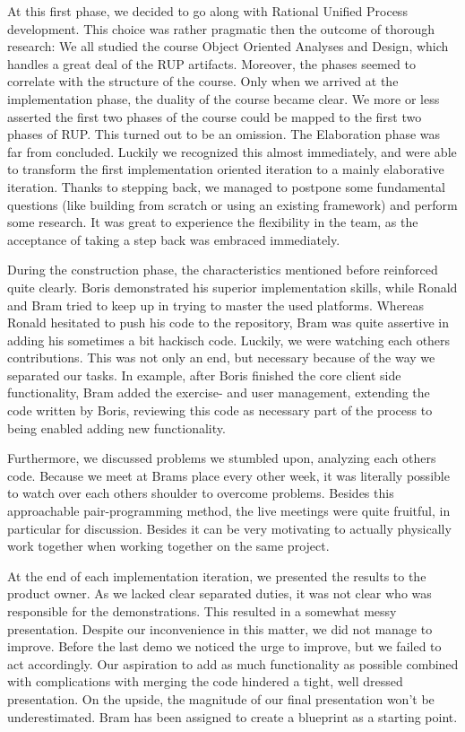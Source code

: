 At this first phase, we decided to go along with Rational Unified Process
development. This choice was rather pragmatic then the outcome of thorough
research: We all studied the course Object Oriented Analyses and Design, which
handles a great deal of the RUP artifacts. Moreover, the phases seemed to 
correlate with the structure of the course. Only when we arrived at the 
implementation phase, the duality of the course became clear. We more or less
asserted the first two phases of the course could be mapped to the first two
phases of RUP. This turned out to be an omission. The Elaboration phase was far
from concluded. Luckily we recognized this almost immediately, and were able
to transform the first implementation oriented iteration to a mainly 
elaborative iteration. Thanks to stepping back, we managed to postpone some
fundamental questions (like building from scratch or using an existing
framework) and perform some research. It was great to experience the
flexibility in the team, as the acceptance of taking a step back was
embraced immediately. 

During the construction phase, the characteristics mentioned before reinforced
quite clearly. Boris demonstrated his superior implementation skills, 
while Ronald and Bram tried to keep up in trying to master the used platforms. 
Whereas Ronald hesitated to push his code to the repository, Bram was quite 
assertive in adding his sometimes a bit hackisch code. Luckily, we were watching 
each others contributions. This was not only an end, but necessary because of
the way we separated our tasks. In example, after Boris finished the core client
side functionality, Bram added the exercise- and user management, extending the
code written by Boris, reviewing this code as necessary part of the process
to being enabled adding new functionality.

Furthermore, we discussed problems we stumbled upon, analyzing each others code.
Because we meet at Brams place every other week, it was literally possible to
watch over each others shoulder to overcome problems. Besides this approachable
pair-programming method, the live meetings were quite fruitful, in particular
for discussion. Besides it can be very motivating to actually physically work
together when working together on the same project. 

At the end of each implementation iteration, we presented the results to the product
owner. As we lacked clear separated duties, it was not clear who was responsible 
for the demonstrations. This resulted in a somewhat messy presentation. Despite
our inconvenience in this matter, we did not manage to improve. Before 
the last demo we noticed the urge to improve, but we failed to act
accordingly. Our aspiration to add as much functionality as possible combined
with complications with merging the code hindered a tight, well dressed
presentation. On the upside, the magnitude of our final presentation won't be
underestimated. Bram has been assigned to create a blueprint as a starting
point.

